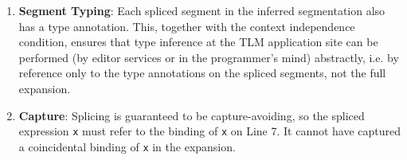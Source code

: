 \documentclass[acmsmall]{acmart}
\newcommand{\li}[1]{\lstinline[basicstyle=\ttfamily\fontsize{9pt}{1em}\selectfont]{#1}}
\begin{document}
\begin{enumerate}[leftmargin=12pt]
\item \textbf{Segment Typing}: Each spliced segment in the inferred segmentation also has  a type annotation. This, together with the context independence condition, ensures that type inference at the TLM application site can be performed (by editor services or in the programmer's mind) abstractly, i.e. by reference only to the type annotations on the spliced segments, not the full expansion.  %
\item \textbf{Capture}: Splicing is guaranteed to be capture-avoiding, so the spliced expression \li{x} must refer to the binding of \li{x} on Line 7. It cannot have captured a coincidental binding of \li{x} in the expansion. %
\end{enumerate}


\end{document}
